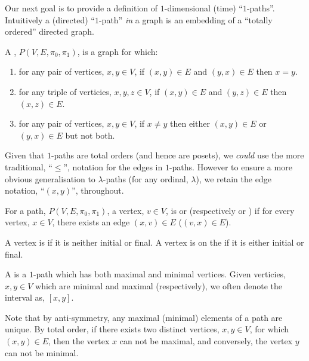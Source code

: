 \documentclass[a4paper]{amsart}
\begin{document}
Our next goal is to provide a definition of $1$-dimensional (time) ``$1$-paths''.
Intuitively a (directed) ``$1$-path'' \emph{in} a graph is an embedding of a ``totally
ordered'' directed graph.

\begin{definition}
A , $P(V, E, \pi_0, \pi_1)$, is a graph for which:

\begin{enumerate}
\item {} for any pair of vertices, $x, y \in V$, if $(x,y) \in E$ and
$(y,x) \in E$ then $x = y$.
\item {} for any triple of verticies, $x, y, z \in V$, 
if $(x,y) \in E$ and $(y,z) \in E$ then $(x,z) \in E$.
\item {} for any pair of vertices, $x, y \in V$, if $x \neq y$ then
either $(x,y) \in E$ or $(y,x) \in E$ but not both.
\end{enumerate}
\end{definition}

Given that $1$-paths are total orders (and hence are posets), we \emph{could} use the more
traditional, ``$\leq$'', notation for the edges in $1$-paths. However to ensure a more
obvious generalisation to $\lambda$-paths (for any ordinal, $\lambda$), we retain the edge
notation, ``$(x,y)$'', throughout.

\begin{definition}
For a path, $P(V, E, \pi_0, \pi_1)$, a vertex, $v \in V$, is  or
 (respectively  or ) if for every
vertex, $x \in V$, there exists an edge $(x,v) \in E$ ($(v, x) \in E$).

A vertex is  if it is neither initial or final. A vertex is on the  
 if it is either initial or final.

A  is a $1$-path which has both maximal and minimal vertices. Given 
verticies, $x, y \in V$ which are minimal and maximal (respectively), we often denote the 
interval as, $[x,y]$.
\end{definition}

Note that by anti-symmetry, any maximal (minimal) elements of a path are unique. By total
order, if there exists two distinct vertices, $x,y \in V$, for which $(x,y) \in E$, then
the vertex $x$ can not be maximal, and conversely, the vertex $y$ can not be minimal.
\end{document}
